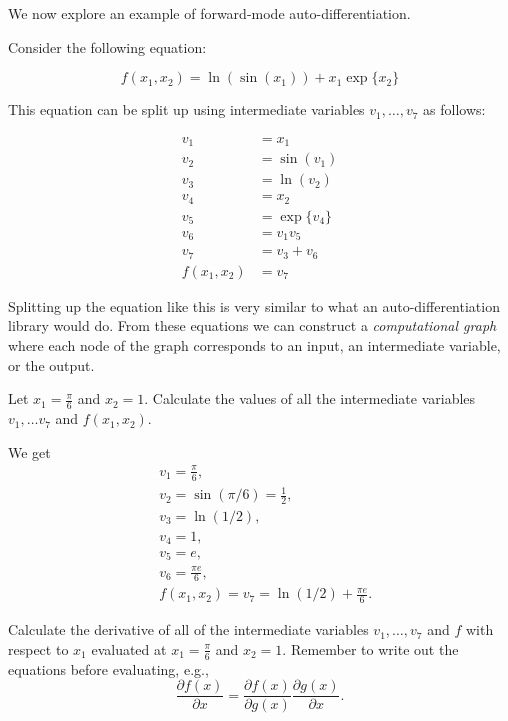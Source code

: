 \documentclass[expanded]{lkx_pset}
\begin{document}
\begin{solution}
	\begin{part}{3}
		We now explore an example of forward-mode auto-differentiation.

	\end{part}
	\begin{solution}
		Consider the following
		equation:

		$$
			f(x_1, x_2) = \ln (\sin (x_1)) + x_1 \exp \{ x_2 \}
		$$

		This equation can be split up using intermediate variables $v_1, \dots, v_7$ as follows:

		\begin{align*}
			v_1         & = x_1            \\
			v_2         & = \sin (v_1)     \\
			v_3         & = \ln (v_2)      \\
			v_4         & = x_2            \\
			v_5         & = \exp \{ v_4 \} \\
			v_6         & = v_1v_5         \\
			v_7         & = v_3 + v_6      \\
			f(x_1, x_2) & = v_7
		\end{align*}

		Splitting up the equation like this is very similar to what an auto-differentiation
		library would do. From these equations we can construct a \textit{computational graph}
		where each node of the graph corresponds to an input, an intermediate variable, or
		the output.

		\begin{part}{1}
			Let $x_1 = \frac{\pi}{6}$ and $x_2 = 1$. Calculate the values of all the
			intermediate variables $v_1, \dots v_7$ and $f(x_1,x_2)$.
		\end{part}

		We get
		\[
			\begin{aligned}
				 & v_1 = \frac{\pi}{6},                         \\
				 & v_2 = \sin(\pi/6) = \frac{1}{2},             \\
				 & v_3 = \ln(1/2),                              \\
				 & v_4 = 1,                                     \\
				 & v_5 = e,                                     \\
				 & v_6 = \frac{\pi e}{6},                       \\
				 & f(x_1,x_2) = v_7 = \ln(1/2)+\frac{\pi e}{6}.
			\end{aligned}
		\]
		\begin{part}{2}
			Calculate the derivative of
			all of the intermediate variables $v_1, \dots, v_7$ and
			$f$ with respect to $x_1$ evaluated
			at $x_1 = \frac{\pi}{6}$ and $x_2 = 1$. Remember to write out the equations before evaluating, e.g.,
			\[
				\frac{\partial f(x)}{\partial x} = \frac{\partial f(x)}{\partial g(x)} \frac{\partial g(x)}{\partial x}.
			\]
		\end{part}


\end{solution}
\end{solution}
\end{document}
